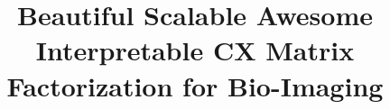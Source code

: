 \documentclass{acm_proc_article-sp}
\begin{document}
\title{Beautiful Scalable Awesome Interpretable CX Matrix Factorization for Bio-Imaging}
%
%
%
%
%
\end{document}
